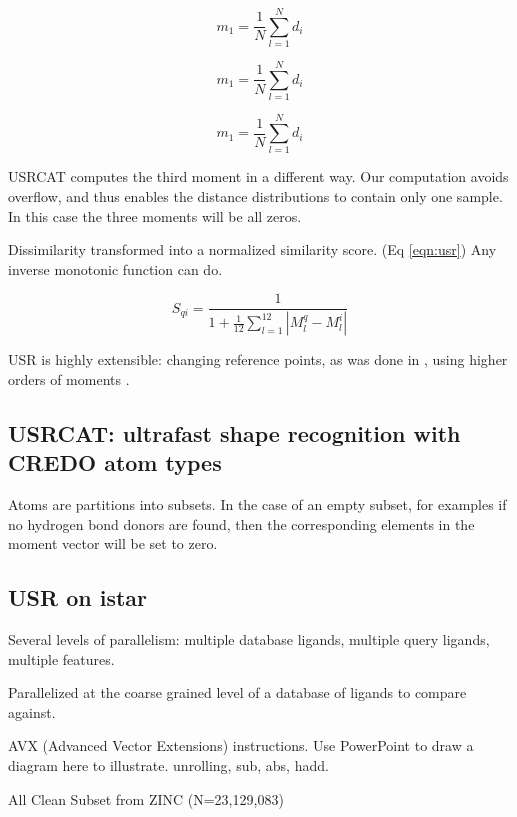 \begin{equation}
m_1=\frac{1}{N}\sum_{l=1}^{N}d_i
\label{eqn:moment1}
\end{equation}

\begin{equation}
m_1=\frac{1}{N}\sum_{l=1}^{N}d_i
\label{eqn:moment2}
\end{equation}

\begin{equation}
m_1=\frac{1}{N}\sum_{l=1}^{N}d_i
\label{eqn:moment3}
\end{equation}

USRCAT computes the third moment in a different way. Our computation avoids overflow, and thus enables the distance distributions to contain only one sample. In this case the three moments will be all zeros.

Dissimilarity transformed into a normalized similarity score. (Eq \ref{eqn:usr}) Any inverse monotonic function can do.

\begin{equation}
S_{qi}=\frac{1}{1+\frac{1}{12}\sum_{l=1}^{12}|M_l^q-M_l^i|}
\label{eqn:usr}
\end{equation}

USR is highly extensible: changing reference points, as was done in \citep{1334,1335}, using higher orders of moments \citep{1333}.

\subsection{USRCAT: ultrafast shape recognition with CREDO atom types}

Atoms are partitions into subsets.
In the case of an empty subset, for examples if no hydrogen bond donors are found, then the corresponding elements in the moment vector will be set to zero.

\subsection{USR on istar}

Several levels of parallelism: multiple database ligands, multiple query ligands, multiple features.

Parallelized at the coarse grained level of a database of ligands to compare against.

AVX (Advanced Vector Extensions) instructions. Use PowerPoint to draw a diagram here to illustrate. unrolling, sub, abs, hadd.

All Clean Subset from ZINC (N=23,129,083)

